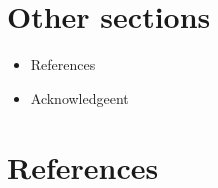 \documentclass[
  letterpaper,
  DIV=11,
  numbers=noendperiod]{scrreprt}
\newlength{\cslhangindent}
\newenvironment{CSLReferences}[2] %
 {\begin{list}{}{%
  \setlength{\itemindent}{0pt}
  \setlength{\leftmargin}{0pt}
  \setlength{\parsep}{0pt}
  \ifodd #1
   \setlength{\leftmargin}{\cslhangindent}
   \setlength{\itemindent}{-1\cslhangindent}
  \fi
  \setlength{\itemsep}{#2\baselineskip}}}
 {\end{list}}
\begin{document}

\chapter{Other sections}\label{other-sections}

\begin{itemize}
\item
  References
\item
  Acknowledgeent
\end{itemize}


\chapter*{References}\label{references}


\label{refs}
\begin{CSLReferences}{0}{1}
\end{CSLReferences}
\end{document}
